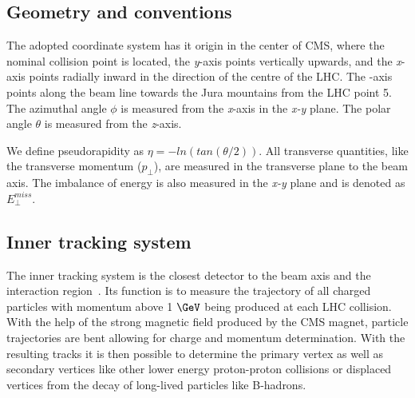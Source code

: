 \subsection{Geometry and conventions}
\label{SECTION:ExperimentalApparatus_CMS_GeometryConventions}


The adopted coordinate system has it origin in the center of \gls{CMS}, where the nominal collision point is located, the \textit{y}-axis points vertically upwards, and the \textit{x}-axis points radially inward in the direction of the centre of the \gls{LHC}. The -axis points along the beam line towards the Jura mountains from the \gls{LHC} point 5. The azimuthal angle $\phi$ is measured from the \textit{x}-axis in the \textit{x-y} plane. The polar angle $\theta$ is measured from the \textit{z}-axis.

We define pseudorapidity as $\eta = -ln(tan(\theta/2))$. All transverse quantities, like the transverse momentum ($p_\perp$), are measured in the transverse plane to the beam axis. The imbalance of energy is also measured in the \textit{x-y} plane and is denoted as $E^{miss}_\perp$.

\subsection{Inner tracking system}
\label{SUBSECTION:ExperimentalApparatus_CMS_Tracker}


The inner tracking system is the closest detector to the beam axis and the interaction region~\cite{CMSTDR:CMSTracker,CMSTDR:CMSTrackerAddendum}. Its function is to measure the trajectory of all charged particles with momentum above 1 $\GeV$ being produced at each \gls{LHC} collision. With the help of the strong magnetic field produced by the \gls{CMS} magnet, particle trajectories are bent allowing for charge and momentum determination. With the resulting tracks it is then possible to determine the primary vertex as well as secondary vertices like other lower energy proton-proton collisions or displaced vertices from the decay of long-lived particles like B-hadrons.

